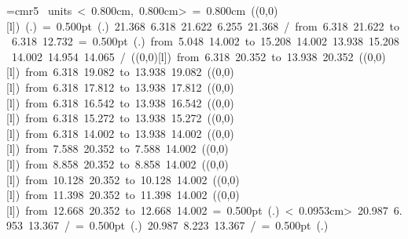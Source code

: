 \font\thinlinefont=cmr5
\mbox{\beginpicture
\setcoordinatesystem units < 0.800cm, 0.800cm>
\unitlength= 0.800cm
\linethickness=1pt
\setplotsymbol ({\makebox(0,0)[l]{\tencirc{}}})
\setshadesymbol ({\thinlinefont .})
\setlinear
%
%
\linethickness= 0.500pt
\setplotsymbol ({\thinlinefont .})
%
%
 21.368  6.318 21.622  6.255 21.368 /
%
\putrule from  6.318 21.622 to  6.318 12.732
%
%
\linethickness= 0.500pt
\setplotsymbol ({\thinlinefont .})
\putrule from  5.048 14.002 to 15.208 14.002
%
%
 13.938 15.208 14.002 14.954 14.065 /
%
%
%
\linethickness=1pt
\setplotsymbol ({\makebox(0,0)[l]{\tencirc{}}})
\putrule from  6.318 20.352 to 13.938 20.352
%
%
\linethickness=1pt
\setplotsymbol ({\makebox(0,0)[l]{\tencirc{}}})
\putrule from  6.318 19.082 to 13.938 19.082
%
%
\linethickness=1pt
\setplotsymbol ({\makebox(0,0)[l]{\tencirc{}}})
\putrule from  6.318 17.812 to 13.938 17.812
%
%
\linethickness=1pt
\setplotsymbol ({\makebox(0,0)[l]{\tencirc{}}})
\putrule from  6.318 16.542 to 13.938 16.542
%
%
\linethickness=1pt
\setplotsymbol ({\makebox(0,0)[l]{\tencirc{}}})
\putrule from  6.318 15.272 to 13.938 15.272
%
%
\linethickness=1pt
\setplotsymbol ({\makebox(0,0)[l]{\tencirc{}}})
\putrule from  6.318 14.002 to 13.938 14.002
%
%
\linethickness=1pt
\setplotsymbol ({\makebox(0,0)[l]{\tencirc{}}})
\putrule from  7.588 20.352 to  7.588 14.002
%
%
\linethickness=1pt
\setplotsymbol ({\makebox(0,0)[l]{\tencirc{}}})
\putrule from  8.858 20.352 to  8.858 14.002
%
%
\linethickness=1pt
\setplotsymbol ({\makebox(0,0)[l]{\tencirc{}}})
\putrule from 10.128 20.352 to 10.128 14.002
%
%
\linethickness=1pt
\setplotsymbol ({\makebox(0,0)[l]{\tencirc{}}})
\putrule from 11.398 20.352 to 11.398 14.002
%
%
\linethickness=1pt
\setplotsymbol ({\makebox(0,0)[l]{\tencirc{}}})
\putrule from 12.668 20.352 to 12.668 14.002
%
%
\linethickness= 0.500pt
\setplotsymbol ({\thinlinefont .})
\setdots < 0.0953cm>
 20.987  6.953 13.367 /
%
%
\linethickness= 0.500pt
\setplotsymbol ({\thinlinefont .})
 20.987  8.223 13.367 /
%
%
\linethickness= 0.500pt
\setplotsymbol ({\thinlinefont .})
}

